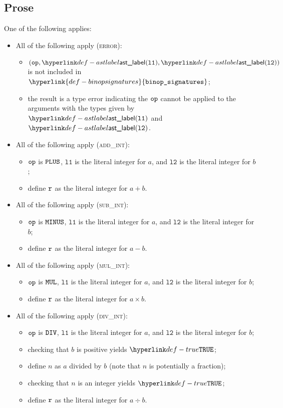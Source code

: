 \documentclass{book}
\newcommand\ProseOrTypeError[0]{\ProseTerminateAs{\TypeErrorConfig}}
\newcommand\binopsignatures[0]{\hyperlink{def-binopsignatures}{\texttt{binop\_signatures}}}
\newcommand\vlone[0]{\texttt{l1}}
\newcommand\vltwo[0]{\texttt{l2}}
\begin{document}
\subsection{Prose}
One of the following applies:
\begin{itemize}
  \item All of the following apply (\textsc{error}):
  \begin{itemize}
    \item $(\op, \astlabel(\vlone), \astlabel(\vltwo))$ is not included in $\binopsignatures$;
    \item the result is a type error indicating the $\texttt{op}$ cannot be applied to the arguments
          with the types given by $\astlabel(\vlone)$ and $\astlabel(\vltwo)$.
  \end{itemize}

  \item All of the following apply (\textsc{add\_int}):
  \begin{itemize}
    \item $\texttt{op}$ is $\texttt{PLUS}$, $\vlone$ is the literal integer for $a$, and $\vltwo$ is the literal integer for $b$;
    \item define $\texttt{r}$ as the literal integer for $a+b$.
  \end{itemize}

  \item All of the following apply (\textsc{sub\_int}):
  \begin{itemize}
    \item $\texttt{op}$ is $\texttt{MINUS}$, $\vlone$ is the literal integer for $a$, and $\vltwo$ is the literal integer for $b$;
    \item define $\texttt{r}$ as the literal integer for $a-b$.
  \end{itemize}

  \item All of the following apply (\textsc{mul\_int}):
  \begin{itemize}
    \item $\texttt{op}$ is $\texttt{MUL}$, $\vlone$ is the literal integer for $a$, and $\vltwo$ is the literal integer for $b$;
    \item define $\texttt{r}$ as the literal integer for $a\times b$.
  \end{itemize}

  \item All of the following apply (\textsc{div\_int}):
  \begin{itemize}
    \item $\texttt{op}$ is $\texttt{DIV}$, $\vlone$ is the literal integer for $a$, and $\vltwo$ is the literal integer for $b$;
    \item checking that $b$ is positive yields $\True$\ProseOrTypeError;
    \item define $n$ as $a$ divided by $b$ (note that $n$ is potentially a fraction);
    \item checking that $n$ is an integer yields $\True$\ProseOrTypeError;
    \item define $\texttt{r}$ as the literal integer for $a\div b$.
  \end{itemize}


\end{itemize}
\end{document}
